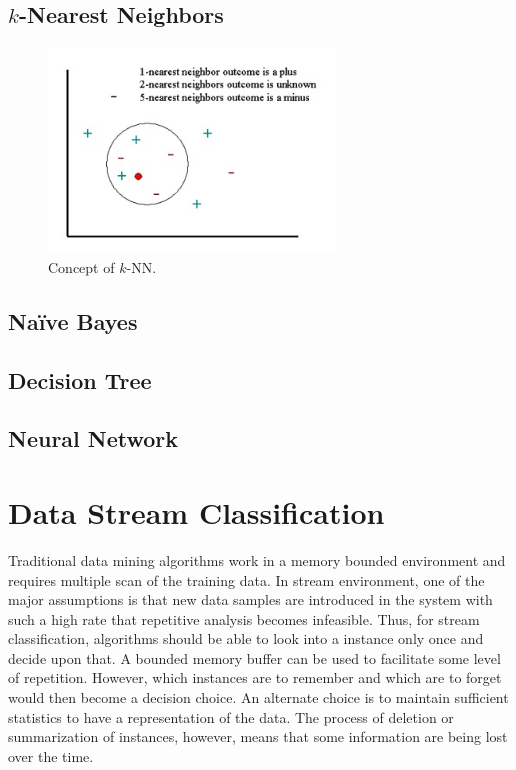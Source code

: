 \documentclass[a4paper, 11pt, oneside]{book}
\begin{document}
\subsection{$k$-Nearest Neighbors}
\begin{figure}[htbp]
	\begin{center}
		\includegraphics[width=3.0in]{figs/knn.jpg}
		\caption{Concept of $k$-NN.}
		\label{fig:bg:knn}
	\end{center}
\end{figure}

\subsection{Na\"ive Bayes}
\subsection{Decision Tree}
\subsection{Neural Network}

\section{Data Stream Classification}
Traditional data mining algorithms work in a memory bounded environment and requires multiple scan of the training data. In stream environment, one of the major assumptions is that new data samples are introduced in the system with such a high rate that repetitive analysis becomes infeasible. Thus, for stream classification, algorithms should be able to look into a instance only once and decide upon that. A bounded memory buffer can be used to facilitate some level of repetition. However, which instances are to remember and which are to forget would then become a decision choice. An alternate choice is to maintain sufficient statistics to have a representation of the data. The process of deletion or summarization of instances, however, means that some information are being lost over the time.
\end{document}
